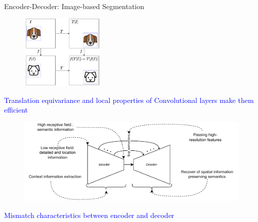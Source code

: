\documentclass[aspectratio=169]{beamer}
\let\oldcite\cite %
\renewcommand{\cite}[1]{{\tiny\oldcite{#1}}}
\begin{document}
\begin{frame}[allowframebreaks]{Encoder-Decoder: Image-based Segmentation}


\begin{figure}%
\begin{centering}
\includegraphics[width=0.35\textwidth]{Figures/tranlationEquivariance.pdf}
\par\end{centering}
\end{figure}

\begin{center}
    \textcolor{blue}{Translation equivariance and local properties of Convolutional layers make them efficient}
\end{center}

\framebreak

\begin{figure}
    \centering \includegraphics[width=1\linewidth]{Figures/encoder-decoder.pdf}
\end{figure}



\begin{center}
    \textcolor{blue}{Mismatch characteristics between encoder and decoder \cite{zhou2020unet, Wang2021}}
\end{center}

\end{frame}
\end{document}
